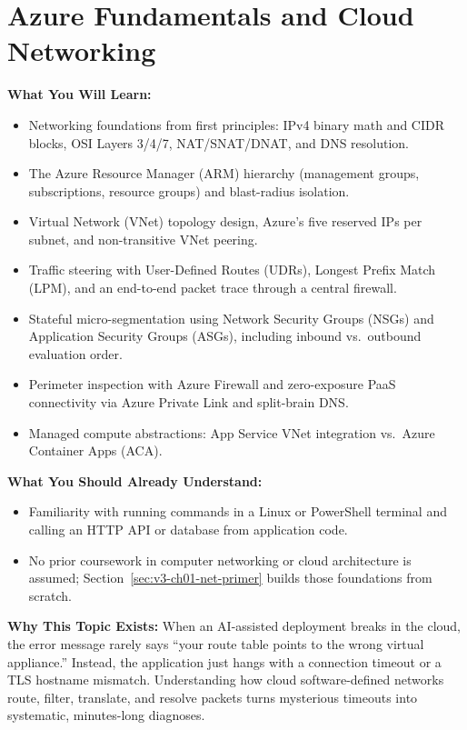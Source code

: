 \chapter{Azure Fundamentals and Cloud Networking}
\label{chap:azure-fundamentals}

\begin{chaptergoalsbox}
\textbf{What You Will Learn:}
\begin{itemize}[leftmargin=12pt]
  \item Networking foundations from first principles: IPv4 binary math and CIDR blocks, OSI Layers 3/4/7, NAT/SNAT/DNAT, and DNS resolution.
  \item The Azure Resource Manager (ARM) hierarchy (management groups, subscriptions, resource groups) and blast-radius isolation.
  \item Virtual Network (VNet) topology design, Azure's five reserved IPs per subnet, and non-transitive VNet peering.
  \item Traffic steering with User-Defined Routes (UDRs), Longest Prefix Match (LPM), and an end-to-end packet trace through a central firewall.
  \item Stateful micro-segmentation using Network Security Groups (NSGs) and Application Security Groups (ASGs), including inbound vs.\ outbound evaluation order.
  \item Perimeter inspection with Azure Firewall and zero-exposure PaaS connectivity via Azure Private Link and split-brain DNS.
  \item Managed compute abstractions: App Service VNet integration vs.\ Azure Container Apps (ACA).
\end{itemize}

\textbf{What You Should Already Understand:}
\begin{itemize}[leftmargin=12pt]
  \item Familiarity with running commands in a Linux or PowerShell terminal and calling an HTTP API or database from application code.
  \item No prior coursework in computer networking or cloud architecture is assumed; Section~\ref{sec:v3-ch01-net-primer} builds those foundations from scratch.
\end{itemize}

\textbf{Why This Topic Exists:}
When an AI-assisted deployment breaks in the cloud, the error message rarely says ``your route table points to the wrong virtual appliance.'' Instead, the application just hangs with a connection timeout or a TLS hostname mismatch. Understanding how cloud software-defined networks route, filter, translate, and resolve packets turns mysterious timeouts into systematic, minutes-long diagnoses.


\end{chaptergoalsbox}
